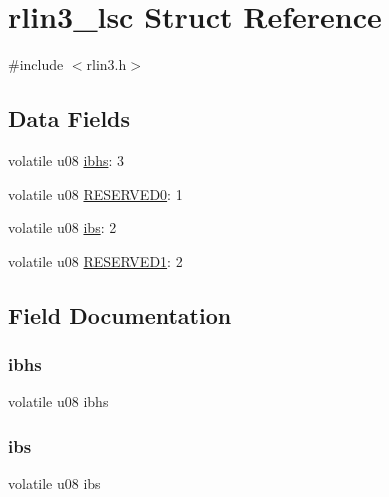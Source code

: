 \hypertarget{structrlin3__lsc}{}\section{rlin3\+\_\+lsc Struct Reference}
\label{structrlin3__lsc}


{\ttfamily \#include $<$rlin3.\+h$>$}

\subsection*{Data Fields}
\begin{DoxyCompactItemize}
\item 
volatile u08 \mbox{\hyperlink{structrlin3__lsc_a48fda0569d10b8fee79941f218c9f86d}{ibhs}}\+: 3
\item 
volatile u08 \mbox{\hyperlink{structrlin3__lsc_a59c0b30ccfb89f1b34e9682741859abd}{R\+E\+S\+E\+R\+V\+E\+D0}}\+: 1
\item 
volatile u08 \mbox{\hyperlink{structrlin3__lsc_a81de84e8694dd972c43981b406334dea}{ibs}}\+: 2
\item 
volatile u08 \mbox{\hyperlink{structrlin3__lsc_a715c3fdf1f14a6aa267daed3d2d6fba1}{R\+E\+S\+E\+R\+V\+E\+D1}}\+: 2
\end{DoxyCompactItemize}


\subsection{Field Documentation}
\mbox{\label{structrlin3__lsc_a48fda0569d10b8fee79941f218c9f86d}} 
\subsubsection{\texorpdfstring{ibhs}{ibhs}}
{\footnotesize\ttfamily volatile u08 ibhs}

\mbox{\label{structrlin3__lsc_a81de84e8694dd972c43981b406334dea}} 
\subsubsection{\texorpdfstring{ibs}{ibs}}
{\footnotesize\ttfamily volatile u08 ibs}

